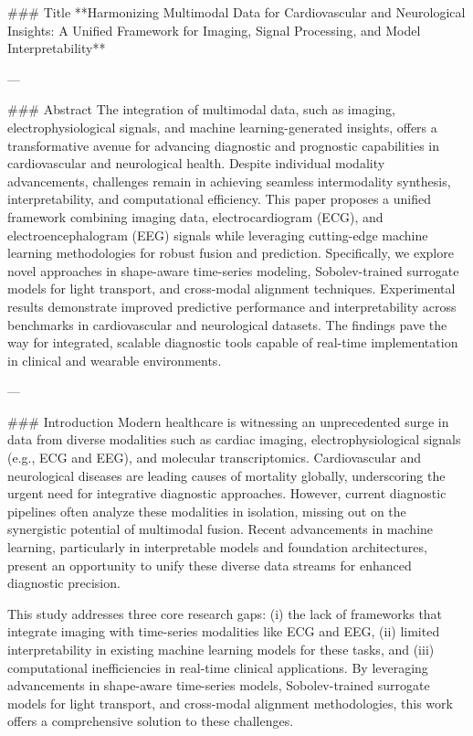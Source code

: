 ### Title  
**Harmonizing Multimodal Data for Cardiovascular and Neurological Insights: A Unified Framework for Imaging, Signal Processing, and Model Interpretability**

---

### Abstract  
The integration of multimodal data, such as imaging, electrophysiological signals, and machine learning-generated insights, offers a transformative avenue for advancing diagnostic and prognostic capabilities in cardiovascular and neurological health. Despite individual modality advancements, challenges remain in achieving seamless intermodality synthesis, interpretability, and computational efficiency. This paper proposes a unified framework combining imaging data, electrocardiogram (ECG), and electroencephalogram (EEG) signals while leveraging cutting-edge machine learning methodologies for robust fusion and prediction. Specifically, we explore novel approaches in shape-aware time-series modeling, Sobolev-trained surrogate models for light transport, and cross-modal alignment techniques. Experimental results demonstrate improved predictive performance and interpretability across benchmarks in cardiovascular and neurological datasets. The findings pave the way for integrated, scalable diagnostic tools capable of real-time implementation in clinical and wearable environments.

---

### Introduction  
Modern healthcare is witnessing an unprecedented surge in data from diverse modalities such as cardiac imaging, electrophysiological signals (e.g., ECG and EEG), and molecular transcriptomics. Cardiovascular and neurological diseases are leading causes of mortality globally, underscoring the urgent need for integrative diagnostic approaches. However, current diagnostic pipelines often analyze these modalities in isolation, missing out on the synergistic potential of multimodal fusion. Recent advancements in machine learning, particularly in interpretable models and foundation architectures, present an opportunity to unify these diverse data streams for enhanced diagnostic precision.

This study addresses three core research gaps: (i) the lack of frameworks that integrate imaging with time-series modalities like ECG and EEG, (ii) limited interpretability in existing machine learning models for these tasks, and (iii) computational inefficiencies in real-time clinical applications. By leveraging advancements in shape-aware time-series models, Sobolev-trained surrogate models for light transport, and cross-modal alignment methodologies, this work offers a comprehensive solution to these challenges.

